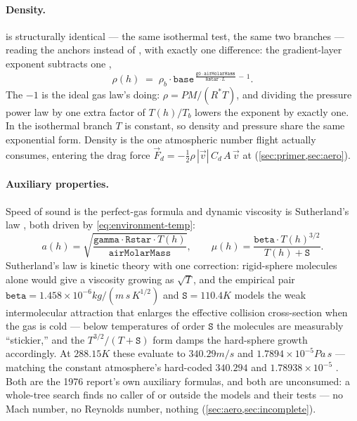 \paragraph{Density.}  is structurally identical --- the same isothermal test,
the same two branches --- reading the  anchors instead of
 , with exactly one difference:
the gradient-layer exponent subtracts one ,
\begin{equation}
\rho(h) \;=\; \rho_b\cdot\mathtt{base}^{\,\frac{\mathtt{g0}\cdot\mathtt{airMolarMass}}{\mathtt{Rstar}\cdot L}\, -\, 1}.
\label{eq:environment-rho}
\end{equation}
The $-1$ is the ideal gas law's doing: $\rho = PM/(R^{*}T)$, and dividing the pressure power
law by one extra factor of $T(h)/T_b$ lowers the exponent by exactly one. In the isothermal
branch $T$ is constant, so density and pressure share the same exponential form. Density is
the one atmospheric number flight actually consumes, entering the drag force
$\vec F_d = -\tfrac{1}{2}\rho\,|\vec v|\,C_d\,A\,\vec v$ at
 (\cref{sec:primer,sec:aero}).

\paragraph{Auxiliary properties.} Speed of sound is the perfect-gas formula
 and dynamic viscosity is Sutherland's law
, both driven by \cref{eq:environment-temp}:
\begin{equation}
a(h) = \sqrt{\frac{\mathtt{gamma}\cdot\mathtt{Rstar}\cdot T(h)}{\mathtt{airMolarMass}}},
\qquad
\mu(h) = \frac{\mathtt{beta}\cdot T(h)^{3/2}}{T(h) + \mathtt{S}}.
\label{eq:environment-aux}
\end{equation}
Sutherland's law is kinetic theory with one correction: rigid-sphere molecules alone would
give a viscosity growing as $\sqrt{T}$, and the empirical pair
$\mathtt{beta} = 1.458\times10^{-6}\unit{kg/(m\,s\,K^{1/2})}$ and
$\mathtt{S} = 110.4\unit{K}$  models the weak
intermolecular attraction that enlarges the effective collision cross-section when the
gas is cold --- below temperatures of order $\mathtt{S}$ the molecules are measurably
``stickier,'' and the $T^{3/2}/(T+\mathtt{S})$ form damps the hard-sphere growth
accordingly. At $288.15\unit{K}$ these evaluate to $340.29\unit{m/s}$ and
$1.7894\times10^{-5}\unit{Pa\,s}$ --- matching the constant atmosphere's hard-coded
$340.294$ and $1.78938\times10^{-5}$ . Both are the 1976
report's own auxiliary formulas, and both are unconsumed: a whole-tree search finds no
caller of  or  outside the models and their
tests --- no Mach number, no Reynolds number, nothing (\cref{sec:aero,sec:incomplete}).

